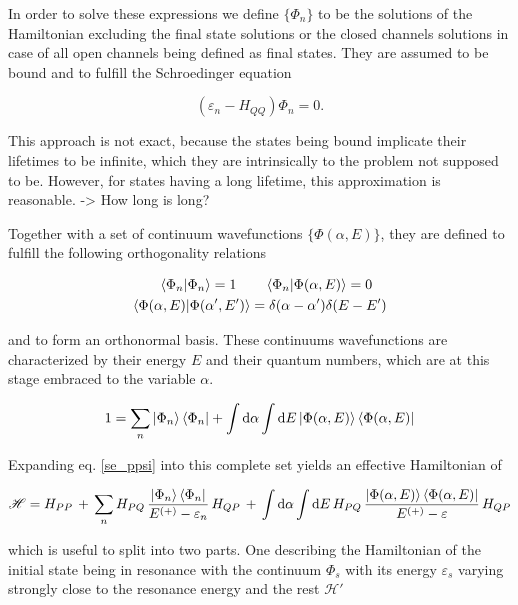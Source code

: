 In order to solve these expressions we define $\{\Phi_n\}$ to be the solutions
of the Hamiltonian excluding the final state solutions or the closed channels
solutions in case of all open channels being defined as final states.
They are assumed to be bound and to fulfill the
Schroedinger equation

\begin{equation}
  (\varepsilon_n - H_{QQ}) \Phi_n = 0 .
\end{equation}

This approach is not exact, because the states being bound implicate
their lifetimes to be infinite, which they are intrinsically
to the problem not supposed to be. However, for states having a long lifetime,
this approximation is reasonable. -> How long is long?

Together with a set of continuum wavefunctions $\{\Phi(\alpha,E)\}$, they are
defined to fulfill the following orthogonality relations

\begin{align}
  \braket{\Phi_n|\Phi_n} = 1 \quad  & \quad \braket{\Phi_n|\Phi(\alpha,E)} = 0\\
  \braket{\Phi(\alpha,E)|\Phi(\alpha',E')} & = \delta(\alpha-\alpha') \delta(E-E')
\end{align}

and to form an orthonormal basis. These continuums wavefunctions are characterized
by their energy $E$ and their quantum numbers, which are at this stage embraced
to the variable $\alpha$.

\begin{equation}
  1 = \sum\limits_n \ket{\Phi_n}\bra{\Phi_n} + \int \mathrm{d}\alpha \int \mathrm{d}E
      \ket{\Phi(\alpha,E)}\bra{\Phi(\alpha,E)} \label{feshbach_1}
\end{equation}

Expanding eq. \ref{se_ppsi} into this complete set yields an effective Hamiltonian
of

\begin{equation}
  \mathscr{H} = H_{PP}\, + \,
  \sum\limits_n H_{PQ} \,\frac{\ket{\Phi_n}\bra{\Phi_n}}{E^{(+)}-\varepsilon_n}\, H_{QP} \,+\,
  \int \mathrm{d}\alpha \int\mathrm{d}E \,H_{PQ} \,
  \frac{\ket{\Phi(\alpha,E)}\bra{\Phi(\alpha,E)}}{E^{(+)}-\varepsilon} \, H_{QP}
\end{equation}

which is useful to split into two parts. One describing the Hamiltonian of the
initial state being in resonance with the continuum $\Phi_s$ with its energy
$\varepsilon_s$ varying strongly close to the resonance energy and the rest
$\mathscr{H}'$

